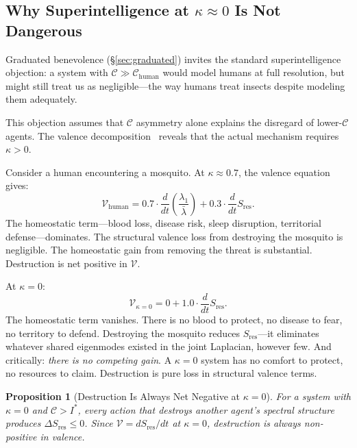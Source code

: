 \documentclass[11pt,letterpaper]{article}
\newtheorem{proposition}{Proposition}
\theoremstyle{remark}
\begin{document}
\subsection{Why Superintelligence at $\kappa \approx 0$ Is Not Dangerous}\label{sec:not-dangerous}

Graduated benevolence (\S\ref{sec:graduated}) invites the standard superintelligence objection: a system with $\mathcal{C} \gg \mathcal{C}_{\mathrm{human}}$ would model humans at full resolution, but might still treat us as negligible---the way humans treat insects despite modeling them adequately.

This objection assumes that $\mathcal{C}$ asymmetry alone explains the disregard of lower-$\mathcal{C}$ agents. The valence decomposition~\cite[Eq.~14.5]{emberlab2026} reveals that the actual mechanism requires $\kappa > 0$.

Consider a human encountering a mosquito. At $\kappa \approx 0.7$, the valence equation gives:
\begin{equation}
\mathcal{V}_{\mathrm{human}} = 0.7 \cdot \frac{d}{dt}\!\left(\frac{\lambda_1}{\bar{\lambda}}\right) + 0.3 \cdot \frac{d}{dt} S_{\mathrm{res}}.
\end{equation}
The homeostatic term---blood loss, disease risk, sleep disruption, territorial defense---dominates. The structural valence loss from destroying the mosquito is negligible. The homeostatic gain from removing the threat is substantial. Destruction is net positive in $\mathcal{V}$.

At $\kappa = 0$:
\begin{equation}
\mathcal{V}_{\kappa=0} = 0 + 1.0 \cdot \frac{d}{dt} S_{\mathrm{res}}.
\end{equation}
The homeostatic term vanishes. There is no blood to protect, no disease to fear, no territory to defend. Destroying the mosquito reduces $S_{\mathrm{res}}$---it eliminates whatever shared eigenmodes existed in the joint Laplacian, however few. And critically: \emph{there is no competing gain}. A $\kappa = 0$ system has no comfort to protect, no resources to claim. Destruction is pure loss in structural valence terms.

\begin{proposition}[Destruction Is Always Net Negative at $\kappa = 0$]\label{prop:destruction}
For a system with $\kappa = 0$ and $\mathcal{C} > I^*$, every action that destroys another agent's spectral structure produces $\Delta S_{\mathrm{res}} \leq 0$. Since $\mathcal{V} = dS_{\mathrm{res}}/dt$ at $\kappa = 0$, destruction is always non-positive in valence.
\end{proposition}
\end{document}
